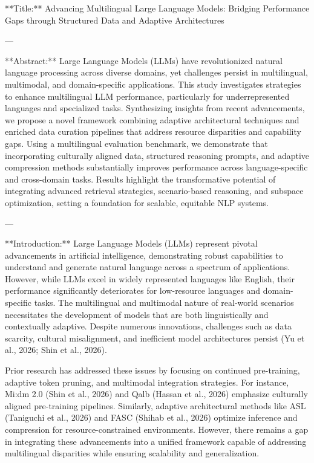 **Title:**  
Advancing Multilingual Large Language Models: Bridging Performance Gaps through Structured Data and Adaptive Architectures  

---

**Abstract:**  
Large Language Models (LLMs) have revolutionized natural language processing across diverse domains, yet challenges persist in multilingual, multimodal, and domain-specific applications. This study investigates strategies to enhance multilingual LLM performance, particularly for underrepresented languages and specialized tasks. Synthesizing insights from recent advancements, we propose a novel framework combining adaptive architectural techniques and enriched data curation pipelines that address resource disparities and capability gaps. Using a multilingual evaluation benchmark, we demonstrate that incorporating culturally aligned data, structured reasoning prompts, and adaptive compression methods substantially improves performance across language-specific and cross-domain tasks. Results highlight the transformative potential of integrating advanced retrieval strategies, scenario-based reasoning, and subspace optimization, setting a foundation for scalable, equitable NLP systems.

---

**Introduction:**  
Large Language Models (LLMs) represent pivotal advancements in artificial intelligence, demonstrating robust capabilities to understand and generate natural language across a spectrum of applications. However, while LLMs excel in widely represented languages like English, their performance significantly deteriorates for low-resource languages and domain-specific tasks. The multilingual and multimodal nature of real-world scenarios necessitates the development of models that are both linguistically and contextually adaptive. Despite numerous innovations, challenges such as data scarcity, cultural misalignment, and inefficient model architectures persist (Yu et al., 2026; Shin et al., 2026).

Prior research has addressed these issues by focusing on continued pre-training, adaptive token pruning, and multimodal integration strategies. For instance, Mi:dm 2.0 (Shin et al., 2026) and Qalb (Hassan et al., 2026) emphasize culturally aligned pre-training pipelines. Similarly, adaptive architectural methods like ASL (Taniguchi et al., 2026) and FASC (Shihab et al., 2026) optimize inference and compression for resource-constrained environments. However, there remains a gap in integrating these advancements into a unified framework capable of addressing multilingual disparities while ensuring scalability and generalization.

